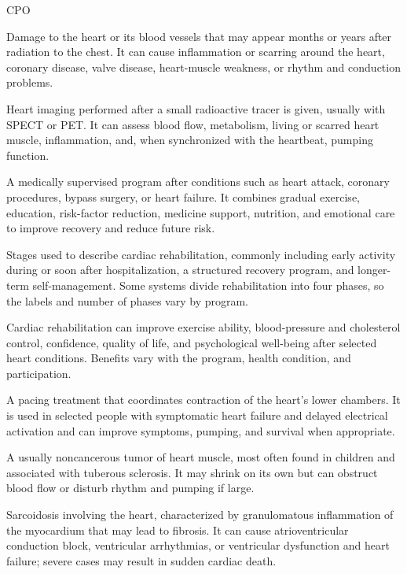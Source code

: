 \synonyms
CPO

 Damage to the heart or its blood vessels that may appear months or years after radiation to the chest. It can cause inflammation or scarring around the heart, coronary disease, valve disease, heart-muscle weakness, or rhythm and conduction problems.

 Heart imaging performed after a small radioactive tracer is given, usually with SPECT or PET. It can assess blood flow, metabolism, living or scarred heart muscle, inflammation, and, when synchronized with the heartbeat, pumping function.

 A medically supervised program after conditions such as heart attack, coronary procedures, bypass surgery, or heart failure. It combines gradual exercise, education, risk-factor reduction, medicine support, nutrition, and emotional care to improve recovery and reduce future risk.

 Stages used to describe cardiac rehabilitation, commonly including early activity during or soon after hospitalization, a structured recovery program, and longer-term self-management. Some systems divide rehabilitation into four phases, so the labels and number of phases vary by program.

 Cardiac rehabilitation can improve exercise ability, blood-pressure and cholesterol control, confidence, quality of life, and psychological well-being after selected heart conditions. Benefits vary with the program, health condition, and participation.

 A pacing treatment that coordinates contraction of the heart's lower chambers. It is used in selected people with symptomatic heart failure and delayed electrical activation and can improve symptoms, pumping, and survival when appropriate.

 A usually noncancerous tumor of heart muscle, most often found in children and associated with tuberous sclerosis. It may shrink on its own but can obstruct blood flow or disturb rhythm and pumping if large.

 Sarcoidosis involving the heart, characterized by granulomatous inflammation of the myocardium that may lead to fibrosis. It can cause atrioventricular conduction block, ventricular arrhythmias, or ventricular dysfunction and heart failure; severe cases may result in sudden cardiac death.

